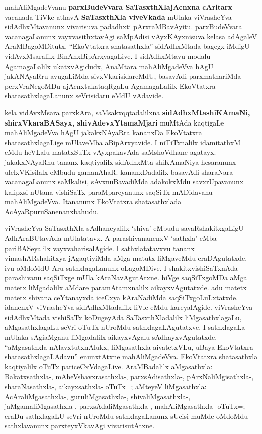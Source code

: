 mahAliMgadeVvanu \textbf{parxBudeVvara SaTasxthXlajAcnxna cAritarx} vacanada TiVke athavA \textbf{SaTasxthXla viveVkada} mUlaka viVrasheYva sidAdhxMtavanunx vivarisuva padadhxti pArxraMBavAyitu. parxBudeVvara vacanagaLanunx vayxvasithxtavAgi saMpAdisi vAyxKAyxnisuva kelasa adAgaleV AraMBa\-goMDitutx. ``EkoVtatxra shatasathxla'' sidAdhxMtada bagegx iMdigU vidAvxMsaralilx BinAnxBipArxyagaLive. I sidAdhxMtavu modalu AgamagaLalilx ukatxvAgidudx, AnaMtara mahAliMgadeVva hAgU jakANAyaRru avugaLiMda sivxVkarisidareMdU, basavAdi parxmathariMda perxVraNegoMDu ajAcnxtakataqRgaLu AgamagaLalilx EkoVtatxra shatasathxlagaLanunx seVrisidaru eMdU vAdavide.

kela vidAvxMsara parxkAra,  saMsakxqqtadalilxna \textbf{sidAdhxMtashiKAmaNi, shirxVkaraBASayx, shivAdevxYtamaMjari} muMtAda kaqtigaLe mahAliMgadeVva hAgU jakakxNAyaRra kananxDa EkoVtatxra shatasathxlagaLige mUlaveMba aBipArxyavide. I niTiTxnalilx idamitathxM eMdu heVLalu matatxSuTx vAyxpakavAda saMshoVdhane agatayx. jakakxNAyaRnu tananx kaqtiyalilx sidAdhxMta shiKAmaNiya hesaranunx ulelxVKisilalx eMbudu gamanAhaR. kananxDadalilx basavAdi sharaNara vacanagaLanunx saMkalisi, sAvxnuBavadiMda adakokxMdu savxrUpavanunx kalipxsi nUtana vishiSaTx paraMpareyanunx saqSiTx mADidavanu mahAliMgadeVva. Itananunx EkoVtatxra shatasathxlada AcAyaRpuruSanenanxbahudu.

viVrasheYva SaTasxthXla sAdhaneyalilx `shiva' eMbudu savaRshakitxgaLigU AdhAraBUtavAda mUlatatavx. A parashivananenxV `sathxla' eMba pariBASeyalilx vayxvaharisalAgide. I sathxlatatavxvu tananx vimashARshakitxya jAgaqtiyiMda aMga matutx liMgaveMdu eraDAgutatxde. ivu oMdoMdU Aru sathxlagaLanunx oLagoMDive. I shakitxvishiSaTxnAda parashivanu saqSiTxge mUla kAraNavAgutAtxne. hiVge saqSiTxgoMDa aMga matetx liMgadalilx aMdare paramAtamxnalilx aikayxvAgutatxde. adu matetx matetx shivana ceYtanayxda iceCxya kAraNadiMda saqSiTxgoLuLxtatxde. idanenxV viVrasheYva sidAdhxMtadalilx liVle eMdu kareyalAgide. viVrasheYva sidAdhxMtada vishiSaTx koDugeyAda SaTasxthXladalilx  liMgasathxlagaLu,  aMgasathxlagaLu seVri oTuTx nUroMdu sathxlagaLAgutatxve. I sathxlagaLa mUlaka sAgiaMganu liMgadalilx aikayxvAgalu sAdhayxvAgutatxde. ``aMgasathxla nAlavxtutxnAlukx, liMgasathxla aivatetxVLu, uBaya EkoVtatxra shatasathxlagaLAdavu'' enunxtAtxne mahAliMgadeVva. EkoVtatxra shatasathxla kaqtiyalilx  oTuTx  pariceCxVdagaLive. AraMBadalilx aMgasathxla: Bakatxsathxla-, mAheVshavxrasathxla-, parxsAdisathxla-, pArxNa\-liMgisathxla-, sharaNasathxla-, aikayxsathxla- oTuTx=; aMteyeV liMgasathxla: AcAraliMgasathxla-, guruliMgasathxla-, shivaliMgasathxla-, jaMgamaliMgasathxla-, parxsAdaliMgasathxla-, mahAliMgasathxla- oTuTx=; eraDu sathxlagaLU seVri nUroMdu sathxlagaLanunx sUcisi muMde oMdoMdu sathxlavanunx parxteyxVkavAgi vivarisutAtxne.

